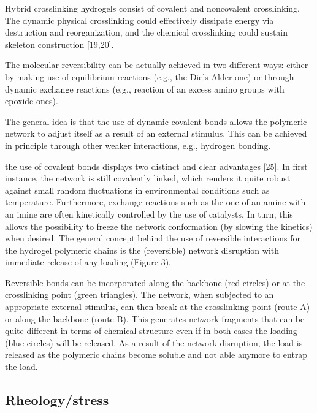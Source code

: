 Hybrid crosslinking hydrogels consist of covalent and noncovalent crosslinking\citep{xuRoleChemicalPhysical2018}. 
The dynamic physical crosslinking could effectively dissipate energy via destruction and reorganization, and the chemical crosslinking could sustain skeleton construction [19,20]\citep{xuRoleChemicalPhysical2018}. 

The molecular reversibility can be actually achieved in two different ways: either by making use of equilibrium reactions (e.g., the Diels-Alder one) or through dynamic exchange reactions (e.g., reaction of an excess amino groups with epoxide ones)\citep{picchioniHydrogelsBasedDynamic2018}.

The general idea is that the use of dynamic covalent bonds allows the polymeric network to adjust itself as a result of an external stimulus\citep{picchioniHydrogelsBasedDynamic2018}. 
This can be achieved in principle through other weaker interactions, e.g., hydrogen bonding\citep{picchioniHydrogelsBasedDynamic2018}. 

the use of covalent bonds displays two distinct and clear advantages [25]. 
In first instance, the network is still covalently linked, which renders it quite robust against small random fluctuations in environmental conditions such as temperature. 
Furthermore, exchange reactions such as the one of an amine with an imine are often kinetically controlled by the use of catalysts. 
In turn, this allows the possibility to freeze the network conformation (by slowing the kinetics) when desired\citep{picchioniHydrogelsBasedDynamic2018}. 
The general concept behind the use of reversible interactions for the hydrogel polymeric chains is the (reversible) network disruption with immediate release of any loading (Figure 3).

Reversible bonds can be incorporated along the backbone (red circles) or at the crosslinking point (green triangles). 
The network, when subjected to an appropriate external stimulus, can then break at the crosslinking point (route A) or along the backbone (route B). 
This generates network fragments that can be quite different in terms of chemical structure even if in both cases the loading (blue circles) will be released. 
As a result of the network disruption, the load is released as the polymeric chains become soluble and not able anymore to entrap the load\citep{picchioniHydrogelsBasedDynamic2018}. 

\subsection{Rheology/stress}\label{ch1:NetworkStructure}

